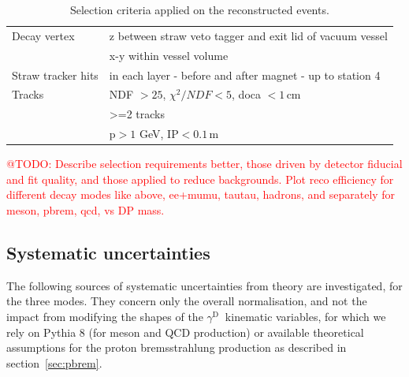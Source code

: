 \documentclass[12pt,a4paper]{article}
\newcommand{\mathDP}{\gamma^{\mathrm{D}}\ }
\newcommand{\DP}{$\mathDP$}
\begin{document}
\begin{table}[thbp]
  \centering
  \begin{tabular}{|p{}|p{}|}
    \hline
    Decay vertex & z between straw veto tagger and exit lid of vacuum vessel \\
    & x-y within vessel volume \\
    \hline
    Straw tracker hits & in each layer - before and after magnet - up to station 4 \\
    \hline
    Tracks & NDF $> 25$, $\chi^2 / NDF < 5$, doca $<1$\,cm \\
    & >=2 tracks \\
    & p$>1$ GeV, IP$<0.1$\,m \\
\hline
\end{tabular}
  \caption{Selection criteria applied on the reconstructed events.}
  \label{tab:recoSel}
\end{table}



\textcolor{red}{@TODO: Describe selection requirements better, those driven
  by detector fiducial and fit quality, and those applied to reduce
  backgrounds. Plot reco efficiency for different decay modes like above,
  ee+mumu, tautau, hadrons, and separately for meson, pbrem, qcd, vs
  DP mass.}


\subsection{Systematic uncertainties}

The following sources of systematic uncertainties from theory are
investigated, for the three modes. They concern only the overall
normalisation, and not the impact from modifying the shapes of the \DP
kinematic variables, for which we rely on Pythia 8 (for meson and QCD
production) or available theoretical assumptions for the proton
bremsstrahlung production as described in section~\ref{sec:pbrem}.
\end{document}

